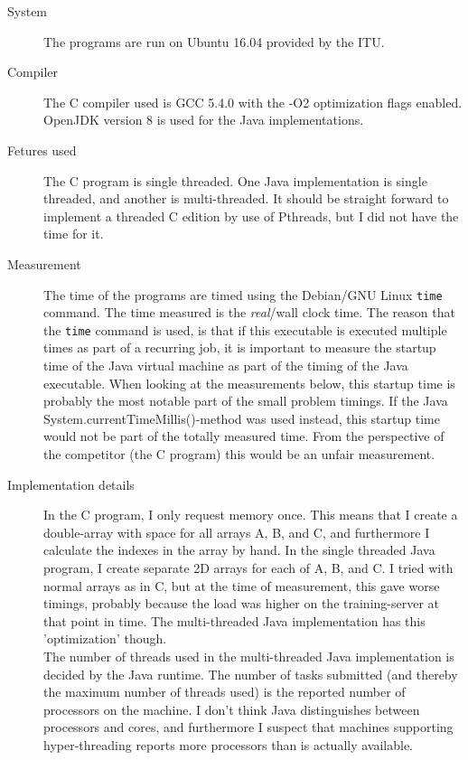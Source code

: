 \documentclass{article}
\begin{document}
	\begin{description}
		\item[System] The programs are run on Ubuntu 16.04 provided by the ITU.
		\item[Compiler] The C compiler used is GCC 5.4.0 with the -O2 optimization flags enabled. OpenJDK version 8 is used for the Java implementations.
		\item[Fetures used] The C program is single threaded. One Java implementation is single threaded, and another is multi-threaded. It should be straight forward to implement a threaded C edition by use of Pthreads, but I did not have the time for it.
		\item[Measurement] The time of the programs are timed using the Debian/GNU Linux \texttt{time} command. The time measured is the \textit{real}/wall clock time.
		The reason that the \texttt{time} command is used, is that if this executable is executed multiple times as part of a recurring job, it is important to measure the startup time of the Java virtual machine as part of the timing of the Java executable. When looking at the measurements below, this startup time is probably the most notable part of the small problem timings.
		If the Java System.currentTimeMillis()-method was used instead, this startup time would not be part of the totally measured time. From the perspective of the competitor (the C program) this would be an unfair measurement.
		\item[Implementation details] In the C program, I only request memory once. This means that I create a double-array with space for all arrays A, B, and C, and furthermore I calculate the indexes in the array by hand. In the single threaded Java program, I create separate 2D arrays for each of A, B, and C. I tried with normal arrays as in C, but at the time of measurement, this gave worse timings, probably because the load was higher on the training-server at that point in time. The multi-threaded Java implementation has this 'optimization' though.\\
		The number of threads used in the multi-threaded Java implementation is decided by the Java runtime. The number of tasks submitted (and thereby the maximum number of threads used) is the reported number of processors on the machine. I don't think Java distinguishes between processors and cores, and furthermore I suspect that machines supporting hyper-threading reports more processors than is actually available.
	\end{description}
\end{document}

